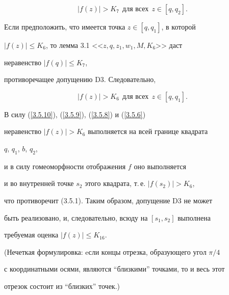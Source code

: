 \begin{pf}
\begin{equation}
|f(z)| > K_7 \ \ \text{для всех} \ \ z\in [q,q_2].


\end{equation}


Если предположить, что имеется точка $z\in [q,q_1]$, в которой 


$|f(z)| \leq K_6$, то лемма 3.1 <<$z, q, z_1, w_1, M, K_6$>> даст 


неравенство $|f(q)| \leq K_7$, 


противоречащее допущению D3. Следовательно, 


\begin{equation}


\label{3.5.10}


|f(z)| > K_6 \ \ \text{для всех}\ \ z\in [q, q_1].


\end{equation}


В силу (\ref{3.5.10}), (\ref{3.5.9}), (\ref{3.5.8}) и (\ref{3.5.6}) 


неравенство $|f(z)| > K_6$ выполняется на всей границе квадрата 


$q$, $q_1$, $b$, $q_2$,


и в силу гомеоморфности отображения $f$ оно выполняется 


и во внутренней точке $s_2$ этого квадрата, т.\,е. $|f(s_2)| > K_6$, 


что противоречит (3.5.1). Таким образом, допущение D3 не может 


быть реализовано, и, следовательно, всюду на $[s_1, s_2]$ выполнена 


требуемая оценка $|f(z)| \leq K_{16}$.


\end{pf}





(Нечеткая формулировка: eсли концы отрезка, образующего угол $\pi /4$ 


с координатными осями, являются ``близкими'' точками, то и весь этот 


отрезок состоит из ``близких'' точек.)





